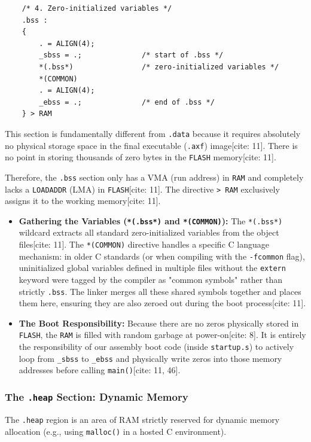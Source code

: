 \begin{lstlisting}
    /* 4. Zero-initialized variables */
    .bss :
    {
        . = ALIGN(4);
        _sbss = .;              /* start of .bss */
        *(.bss*)                /* zero-initialized variables */
        *(COMMON)
        . = ALIGN(4);
        _ebss = .;              /* end of .bss */
    } > RAM
\end{lstlisting}

This section is fundamentally different from \texttt{.data} because it requires absolutely no physical storage space in the final executable (\texttt{.axf}) image[cite: 11]. There is no point in storing thousands of zero bytes in the \texttt{FLASH} memory[cite: 11]. 

Therefore, the \texttt{.bss} section only has a VMA (run address) in \texttt{RAM} and completely lacks a \texttt{LOADADDR} (LMA) in \texttt{FLASH}[cite: 11]. The directive \texttt{> RAM} exclusively assigns it to the working memory[cite: 11].

\begin{itemize}
    \item \textbf{Gathering the Variables (\texttt{*(.bss*)} and \texttt{*(COMMON)}):} The \texttt{*(.bss*)} wildcard extracts all standard zero-initialized variables from the object files[cite: 11]. The \texttt{*(COMMON)} directive handles a specific C language mechanism: in older C standards (or when compiling with the \texttt{-fcommon} flag), uninitialized global variables defined in multiple files without the \texttt{extern} keyword were tagged by the compiler as "common symbols" rather than strictly \texttt{.bss}. The linker merges all these shared symbols together and places them here, ensuring they are also zeroed out during the boot process[cite: 11].
    \item \textbf{The Boot Responsibility:} Because there are no zeros physically stored in \texttt{FLASH}, the \texttt{RAM} is filled with random garbage at power-on[cite: 8]. It is entirely the responsibility of our assembly boot code (inside \texttt{startup.s}) to actively loop from \texttt{\_sbss} to \texttt{\_ebss} and physically write zeros into those memory addresses before calling \texttt{main()}[cite: 11, 46].
\end{itemize}

\subsubsection{The \texttt{.heap} Section: Dynamic Memory}
The \texttt{.heap} region is an area of RAM strictly reserved for dynamic memory allocation (e.g., using \texttt{malloc()} in a hosted C environment). 

